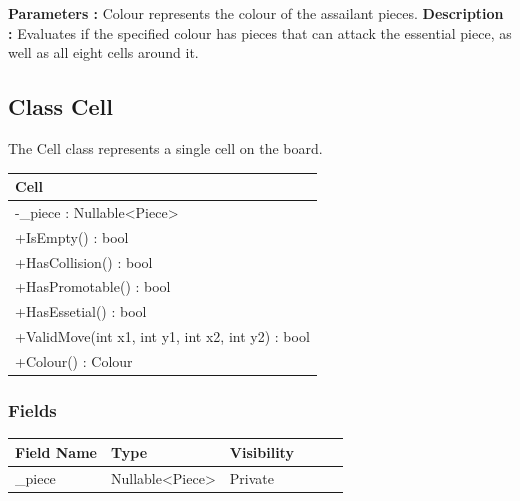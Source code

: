 \documentclass[12pt]{article}
\begin{document}
\textbf{Parameters :}  Colour represents the colour of the assailant pieces.  
\textbf{Description :} Evaluates if the specified colour has pieces that can attack the essential piece, as well as all eight cells around it. 

\newpage


\subsection{Class Cell}

The Cell class represents a single cell on the board.

\begin{table}[H]
    \begin{tabular}{|l|}
    \hline
    \rowcolor[HTML]{C0C0C0} 
    \textbf{Cell}                                    \\ \hline
    \rowcolor[HTML]{EFEFEF}
    -\_piece : Nullable<Piece>                        \\ \hline
    +IsEmpty() : bool                                 \\ \hline
    +HasCollision() : bool                            \\ \hline
    +HasPromotable() : bool                           \\ \hline
    +HasEssetial() : bool                             \\ \hline
    +ValidMove(int x1, int y1, int x2, int y2) : bool \\ \hline
    +Colour() : Colour                                \\ \hline
    \end{tabular}
\end{table}

\subsubsection{Fields}

\begin{table}[H]
    \begin{tabular}{llllll}
    \hline
    \multicolumn{1}{|l|}{\cellcolor[HTML]{EFEFEF}\textbf{Field Name}} & \multicolumn{1}{l|}{\cellcolor[HTML]{EFEFEF}\textbf{Type}} & \multicolumn{1}{l|}{\cellcolor[HTML]{EFEFEF}\textbf{Visibility}} \\ \hline
    \multicolumn{1}{|l|}{\_piece}                                     & \multicolumn{1}{l|}{Nullable<Piece>}                       & \multicolumn{1}{l|}{Private}                                     \\ \hline
    \end{tabular}
\end{table}
\end{document}

